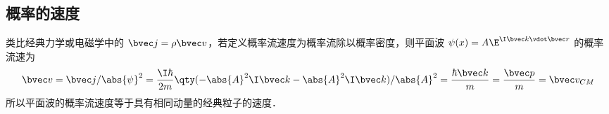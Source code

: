 \subsection{概率的速度}

类比经典力学或电磁学中的 $\bvec j = \rho \bvec v$，若定义概率流速度为概率流除以概率密度，则平面波 $\psi (x) = A\E^{\I \bvec k \vdot \bvec r}$ 的概率流速为
\begin{equation}
\bvec v = \bvec j/\abs{\psi}^2 = \frac{\I\hbar}{2m} \qty(-\abs{A}^2 \I\bvec k - \abs{A}^2 \I\bvec k)/\abs{A}^2 = \frac{\hbar \bvec k}{m} = \frac{\bvec p}{m} = \bvec v_{CM}
\end{equation}
所以平面波的概率流速度等于具有相同动量的经典粒子的速度．
